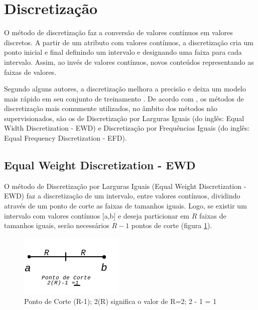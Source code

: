 \section{Discretização}\label{cap:refTeor:sec:discret}

O método de discretização faz a conversão de valores contínuos em valores discretos. A partir de um atributo com valores contínuos, a discretização cria um ponto inicial e final definindo um intervalo e designando uma faixa para cada intervalo. Assim, ao invés de valores contínuos, novos conteúdos representando as faixas de valores. 

Segundo alguns autores, a discretização melhora a precisão e deixa um modelo mais rápido em seu conjunto de treinamento \cite{Catlett2006b,Hwang2002}. De acordo com \cite{Kotsiantis2006, Dougherty1995}, os métodos de discretização mais comumente utilizados, no âmbito dos métodos não supervisionados, são os de Discretização por Larguras Iguais (do inglês: Equal Width Discretization - EWD) e Discretização por Frequências Iguais (do inglês: Equal Frequency Discretization - EFD). 





\subsection{Equal Weight Discretization - EWD}\label{cap:refTeor:subsec:ewd}

O método de Discretização por Larguras Iguais (Equal Weight Discretization - EWD) faz a discretização de um intervalo, entre valores contínuos, dividindo através de um ponto de corte as faixas de tamanhos iguais. Logo, se existir um intervalo com valores contínuos [a,b] e deseja particionar em ${R}$ faixas de tamanhos iguais, serão necessários ${R-1}$ pontos de corte (figura \ref{fig:pontocorte}). 


\begin{figure}[h]
        \centering
        \includegraphics[scale=1]{figs/faixaA-B_PontoCorte.png}
        \caption{Ponto de Corte (R-1); 2(R) significa o valor de R=2; 2 - 1 = 1} \label{fig:pontocorte}
\end{figure}

